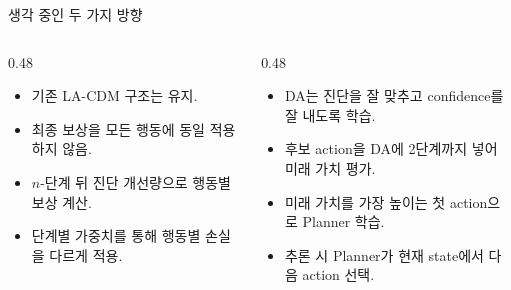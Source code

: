 \documentclass[
11pt,notheorems,hyperref={pdfauthor=whatever}
]{beamer}
\begin{document}
\begin{frame}{생각 중인 두 가지 방향}
\vspace{0.25em}
\begin{columns}[T,onlytextwidth]
\begin{column}{0.48\textwidth}
\begin{center}
\end{center}
\vspace{0.2em}
\scriptsize
\begin{itemize}
  \item 기존 LA-CDM 구조는 유지.
  \item 최종 보상을 모든 행동에 동일 적용하지 않음.
  \item \(n\)-단계 뒤 진단 개선량으로 행동별 보상 계산.
  \item 단계별 가중치를 통해 행동별 손실을 다르게 적용.
\end{itemize}
\end{column}
\begin{column}{0.48\textwidth}
\begin{center}
\end{center}
\vspace{0.2em}
\scriptsize
\begin{itemize}
  \item DA는 진단을 잘 맞추고 confidence를 잘 내도록 학습.
  \item 후보 action을 DA에 2단계까지 넣어 미래 가치 평가.
  \item 미래 가치를 가장 높이는 첫 action으로 Planner 학습.
  \item 추론 시 Planner가 현재 state에서 다음 action 선택.
\end{itemize}
\end{column}
\end{columns}

\end{frame}
\end{document}
